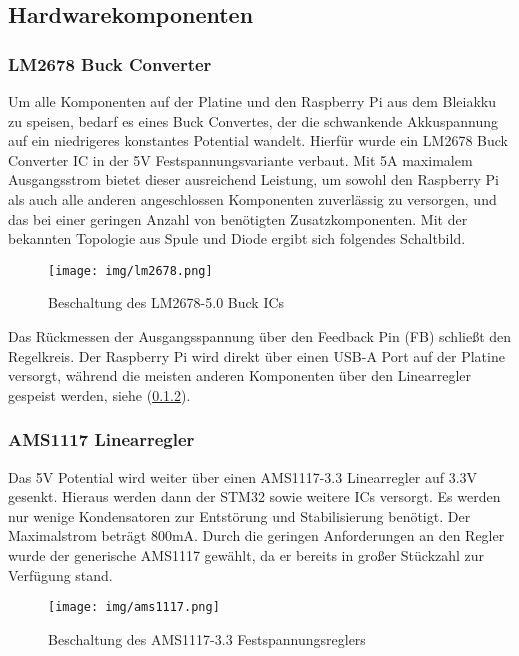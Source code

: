 \documentclass[12pt, a4paper]{report}
\begin{document}
         \subsection{Hardwarekomponenten}
            \subsubsection{LM2678 Buck Converter}
            Um alle Komponenten auf der Platine und den Raspberry Pi aus dem Bleiakku zu speisen, bedarf es eines Buck Convertes, der die schwankende Akkuspannung auf ein niedrigeres konstantes Potential wandelt.
            Hierfür wurde ein LM2678 Buck Converter IC in der 5V Festspannungsvariante verbaut. Mit 5A maximalem Ausgangsstrom bietet dieser ausreichend Leistung, um sowohl den Raspberry Pi als auch alle anderen angeschlossen Komponenten zuverlässig zu versorgen, und das bei einer geringen Anzahl von benötigten Zusatzkomponenten.
            Mit der bekannten Topologie aus Spule und Diode ergibt sich folgendes Schaltbild. 
            \begin{figure}[H]
               \centering
               \texttt{[image: img/lm2678.png]}
               \caption{Beschaltung des LM2678-5.0 Buck ICs}
            \end{figure}
            Das Rückmessen der Ausgangsspannung über den Feedback Pin (FB) schließt den Regelkreis. Der Raspberry Pi wird direkt über einen USB-A Port auf der Platine versorgt, während die meisten anderen Komponenten über den Linearregler gespeist werden, siehe (\ref{ams1117}).
            \subsubsection{AMS1117 Linearregler}\label{ams1117}
            Das 5V Potential wird weiter über einen AMS1117-3.3 Linearregler auf 3.3V gesenkt. Hieraus werden dann der STM32 sowie weitere ICs versorgt. Es werden nur wenige Kondensatoren zur Entstörung und Stabilisierung benötigt. Der Maximalstrom beträgt 800mA. Durch die geringen Anforderungen an den Regler wurde der generische AMS1117 gewählt, da er bereits in großer Stückzahl zur Verfügung stand.
            \begin{figure}[H]
               \centering
               \texttt{[image: img/ams1117.png]}
               \caption{Beschaltung des AMS1117-3.3 Festspannungsreglers}
            \end{figure}
         
\end{document}
